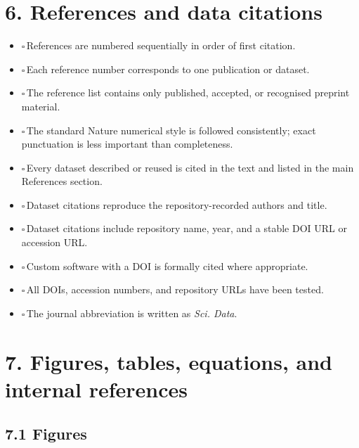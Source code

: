 \documentclass[11pt]{article}
\newcommand{\cbox}{$\square$\,}
\begin{document}
\section*{6. References and data citations}

\begin{itemize}
    \item \cbox References are numbered sequentially in order of first citation.
    \item \cbox Each reference number corresponds to one publication or dataset.
    \item \cbox The reference list contains only published, accepted, or recognised preprint material.
    \item \cbox The standard Nature numerical style is followed consistently; exact punctuation is less important than completeness.
    \item \cbox Every dataset described or reused is cited in the text and listed in the main References section.
    \item \cbox Dataset citations reproduce the repository-recorded authors and title.
    \item \cbox Dataset citations include repository name, year, and a stable DOI URL or accession URL.
    \item \cbox Custom software with a DOI is formally cited where appropriate.
    \item \cbox All DOIs, accession numbers, and repository URLs have been tested.
    \item \cbox The journal abbreviation is written as \textit{Sci. Data}.
\end{itemize}

\section*{7. Figures, tables, equations, and internal references}

\subsection*{7.1 Figures}
\end{document}
